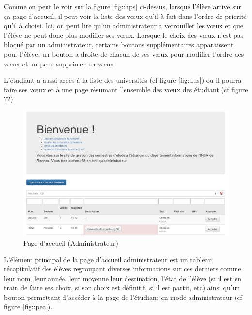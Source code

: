 \bigbreak

Comme on peut le voir sur la figure \ref{fig::hps} ci-dessus, lorsque l'élève arrive sur ça page d'accueil, il peut voir la liste des vœux qu'il à fait dans l'ordre de priorité qu'il à choisi. Ici, on peut lire qu'un administrateur a verrouiller les vœux et que l'élève ne peut donc plus modifier ses vœux. Lorsque le choix des vœux n'est pas bloqué par un administrateur, certains boutons supplémentaires apparaissent pour l'élève: un bouton a droite de chacun de ses vœux pour modifier l'ordre des vœux et un pour supprimer un vœux.

\bigbreak

L'étudiant a aussi accès à la liste des universités (cf figure \ref{fig::lus}) ou il pourra faire ses vœux et à une page résumant l'ensemble des vœux des étudiant (cf figure ??)

\begin{figure}[H]
	\includegraphics[scale=0.35]{images/HPA.png}
	\caption{Page d'accueil (Administrateur)}
	\label{fig::hpa}
\end{figure}

\bigbreak

L'élément principal de la page d'accueil administrateur est un tableau récapitulatif des élèves regroupant diverses informations sur ces derniers comme leur nom, leur année, leur moyenne leur destination, l'état de l'élève (si il est en train de faire ses choix, si son choix est définitif, si il est partit, etc) ainsi qu'un bouton permettant d'accéder à la page de l'étudiant en mode administrateur (cf figure \ref{fig::pea}).

\bigbreak

